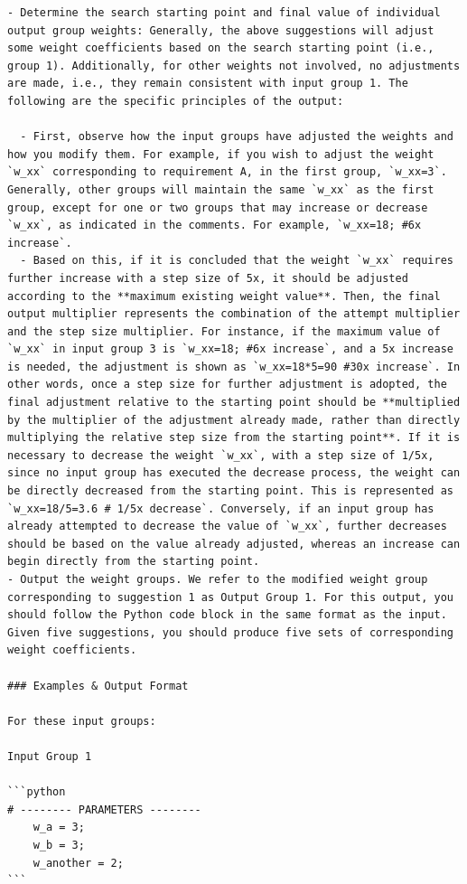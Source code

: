 \documentclass{article}
\begin{document}
\begin{verbatim}
- Determine the search starting point and final value of individual output group weights: Generally, the above suggestions will adjust some weight coefficients based on the search starting point (i.e., group 1). Additionally, for other weights not involved, no adjustments are made, i.e., they remain consistent with input group 1. The following are the specific principles of the output:

  - First, observe how the input groups have adjusted the weights and how you modify them. For example, if you wish to adjust the weight `w_xx` corresponding to requirement A, in the first group, `w_xx=3`. Generally, other groups will maintain the same `w_xx` as the first group, except for one or two groups that may increase or decrease `w_xx`, as indicated in the comments. For example, `w_xx=18; #6x increase`.
  - Based on this, if it is concluded that the weight `w_xx` requires further increase with a step size of 5x, it should be adjusted according to the **maximum existing weight value**. Then, the final output multiplier represents the combination of the attempt multiplier and the step size multiplier. For instance, if the maximum value of `w_xx` in input group 3 is `w_xx=18; #6x increase`, and a 5x increase is needed, the adjustment is shown as `w_xx=18*5=90 #30x increase`. In other words, once a step size for further adjustment is adopted, the final adjustment relative to the starting point should be **multiplied by the multiplier of the adjustment already made, rather than directly multiplying the relative step size from the starting point**. If it is necessary to decrease the weight `w_xx`, with a step size of 1/5x, since no input group has executed the decrease process, the weight can be directly decreased from the starting point. This is represented as `w_xx=18/5=3.6 # 1/5x decrease`. Conversely, if an input group has already attempted to decrease the value of `w_xx`, further decreases should be based on the value already adjusted, whereas an increase can begin directly from the starting point.
- Output the weight groups. We refer to the modified weight group corresponding to suggestion 1 as Output Group 1. For this output, you should follow the Python code block in the same format as the input. Given five suggestions, you should produce five sets of corresponding weight coefficients.

### Examples & Output Format

For these input groups:

Input Group 1

```python
# -------- PARAMETERS --------
    w_a = 3;
    w_b = 3;
    w_another = 2;
```


\end{verbatim}
\end{document}
